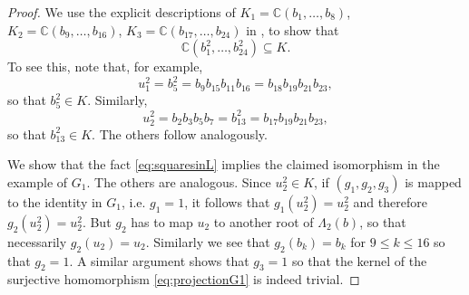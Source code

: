 \documentclass[a4paper,reqno]{amsart}
\numberwithin{equation}{section}
\newcommand{\C}{\mathbb{C}}
\numberwithin{equation}{section}
\begin{document}
\begin{proof}
We use the explicit descriptions of $K_1 = \C(b_1,\dots,b_{8})$, $K_2 = \C(b_9,\dots,b_{16})$, $K_3 = \C(b_{17},\dots,b_{24})$ in , 
to show that
\begin{equation} \label{eq:squaresinL}
    \mathbb{C}(b_1^2,\ldots, b_{24}^2)\subseteq K.
\end{equation}
To see this, note that, for example,
\begin{equation*}
   u_1^2=b_5^2=b_9 b_{15} b_{11} b_{16}=b_{18}b_{19} b_{21}b_{23},
\end{equation*}
so that $b_5^2\in K$. Similarly,
\begin{equation*}
    u_2^2=b_2 b_3 b_5 b_7=b_{13}^2=b_{17} b_{19} b_{21} b_{23},
\end{equation*}
so that $b_{13}^2\in K$. The others follow analogously.

We show that the fact \eqref{eq:squaresinL} implies  the claimed isomorphism in the example of $G_1$. The others are analogous. 
Since $u_2^2\in K$, if $(g_1,g_2,g_3)$ is mapped to the identity in $G_1$, i.e. $g_1=1$, it follows that $g_1(u_2^2)=u_2^2$ and therefore $g_2(u_2^2)=u_2^2$. But $g_2$ has to map $u_2$ to another root of $\Lambda_2(b)$, so that necessarily $g_2(u_2)=u_2$. Similarly we see that $g_2(b_k)=b_k$ for $9\leq k\leq 16$ so that $g_2=1$. A similar argument shows that $g_3=1$ so that the kernel of the surjective homomorphism \eqref{eq:projectionG1} is indeed trivial.\end{proof}

\end{document}
